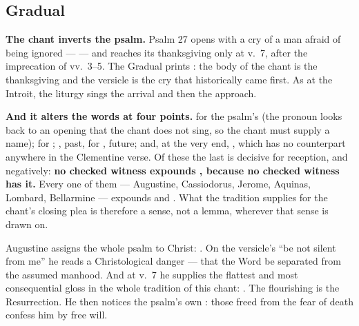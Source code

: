 \elementguard
\subsection*{Gradual }


\textbf{The chant inverts the psalm.} Psalm 27 opens with a cry of a man afraid
of being ignored ---  --- and reaches
its thanksgiving only at v.~7, after the imprecation of vv.~3--5. The Gradual
prints : the body of the chant is the thanksgiving and the
versicle is the cry that historically came first. As at the Introit, the
liturgy sings the arrival and then the approach.

\textbf{And it alters the words at four points.}  for the psalm's
 (the pronoun looks back to an opening  that the chant does not sing, so the chant must supply a name);
 for ; , past, for
, future; and, at the very end, , which
has no counterpart anywhere in the Clementine verse. Of these the last is
decisive for reception, and negatively: \textbf{no checked witness expounds
, because no checked witness has it.} Every one of them
--- Augustine, Cassiodorus, Jerome, Aquinas, Lombard, Bellarmine --- expounds
 and . What the tradition supplies for
the chant's closing plea is therefore a sense, not a lemma, wherever that sense
is drawn on.

\begin{witnessnote}
Augustine assigns the whole psalm to Christ: . On the versicle's ``be not silent from
me'' he reads a Christological danger --- that the Word be separated from the
assumed manhood. And at v.~7 he supplies the flattest and most consequential
gloss in the whole tradition of this chant: . The flourishing is the Resurrection. He then
notices the psalm's own : those freed from the fear of
death confess him by free will.
\end{witnessnote}

